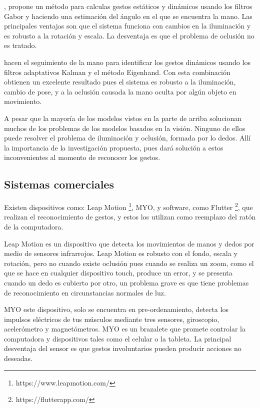 \citep{Huang2011}, propone un método para calculas gestos estáticos y dinámicos usando los filtros Gabor y haciendo una estimación del \'angulo en el que se encuentra la mano. Las principales ventajas son que el sistema funciona con cambios en la iluminaci\'on y es robusto a la rotaci\'on y escala. La desventaja es que el problema de oclusi\'on no es tratado.

\citep{MohdAsaari2014} hacen el seguimiento de la mano para identificar los gestos din\'amicos usando los filtros adaptativos Kalman y el m\'etodo Eigenhand. Con esta combinaci\'on obtienen un excelente resultado pues el sistema es robusto a la iluminaci\'on, cambio de pose, y a la oclusi\'on causada la mano oculta por alg\'un objeto en movimiento. 

 

A pesar que la mayoría de los modelos vistos en la parte de arriba solucionan muchos de los problemas de los modelos basados en la visi\'on. Ninguno de ellos puede resolver el problema de iluminaci\'on y oclusi\'on, formada por lo dedos. All\'i la importancia de la investigaci\'on propuesta, pues dar\'a soluci\'on a estos inconvenientes al momento de reconocer los gestos.
 
\subsection{Sistemas comerciales}

Existen dispositivos como: Leap Motion \footnote{https://www.leapmotion.com/}, MYO, y software, como Flutter \footnote{https://flutterapp.com/}, que realizan el reconocimiento de gestos, y estos los utilizan como reemplazo del rat\'on de la computadora. 
 
Leap Motion es un dispositivo que detecta los movimientos de manos y dedos por medio de sensores infrarrojos. Leap Motion es robusto con el fondo, escala y rotaci\'on,  pero no cuando existe oclusi\'on pues cuando se realiza un zoom, como el que se hace en cualquier dispositivo touch, produce un error, y se presenta cuando un dedo es cubierto por otro, un problema grave es que tiene problemas de reconocimiento en circunstancias normales de luz.  

MYO este dispositivo, solo se encuentra en pre-ordenamiento, detecta los impulsos el\'ectricos de tus m\'usculos mediante tres sensores, giroscopio, aceler\'ometro y magnet\'ometros. MYO es un brazalete  que promete controlar la computadora y dispositivos tales como el celular o la tableta. La principal desventaja del sensor es que gestos involuntarios pueden producir acciones no deseadas.

